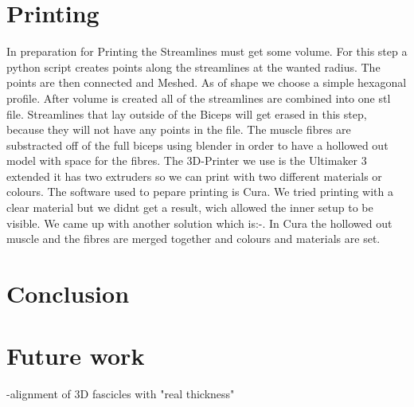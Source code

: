 \documentclass[preprint,journal]{vgtc}       %
\begin{document}
\section{Printing}
In preparation for Printing the Streamlines must get some volume. For this step a python script creates points along the streamlines at the wanted radius. The points are then connected and Meshed. As of shape we choose a simple hexagonal profile. After volume is created all of the streamlines are combined into one stl file. Streamlines that lay outside of the Biceps will get erased in this step, because they will not have any points in the file. The muscle fibres are substracted off of the full biceps using blender in order to have a hollowed out model with space for the fibres. 
The 3D-Printer we use is the Ultimaker 3 extended it has two extruders so we can print with two different materials or colours. The software used to pepare printing is Cura. We tried printing with a clear material but we didnt get a result, wich allowed the inner setup to be visible. We came up with another solution which is:-.
In Cura the hollowed out muscle and the fibres are merged together and colours and materials are set.

\section{Conclusion}


\section{Future work}
-alignment of 3D fascicles with "real thickness"



\end{document}
